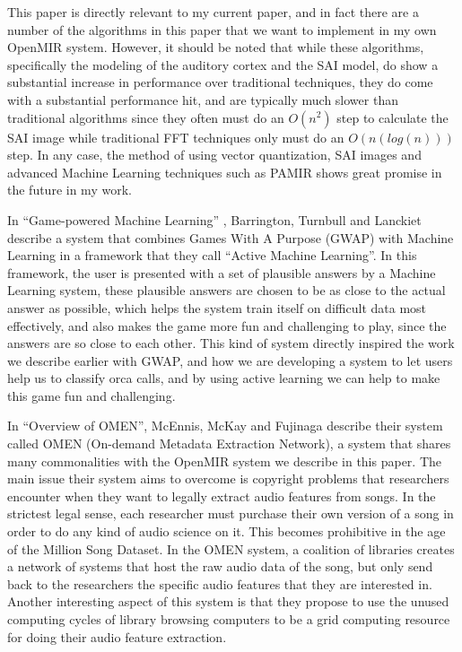 This paper is directly relevant to my current paper, and in fact there
are a number of the algorithms in this paper that we want to implement
in my own OpenMIR system.  However, it should be noted that while
these algorithms, specifically the modeling of the auditory cortex and
the SAI model, do show a substantial increase in performance over
traditional techniques, they do come with a substantial performance
hit, and are typically much slower than traditional algorithms since
they often must do an $O(n^2)$ step to calculate the SAI image while
traditional FFT techniques only must do an $O(n(log(n)))$ step.  In
any case, the method of using vector quantization, SAI images and
advanced Machine Learning techniques such as PAMIR shows great promise
in the future in my work.

In ``Game-powered Machine Learning'' \cite{barrington12}, Barrington,
Turnbull and Lanckiet describe a system that combines Games With A
Purpose (GWAP) with Machine Learning in a framework that they call
``Active Machine Learning''.  In this framework, the user is presented
with a set of plausible answers by a Machine Learning system, these
plausible answers are chosen to be as close to the actual answer as
possible, which helps the system train itself on difficult data most
effectively, and also makes the game more fun and challenging to play,
since the answers are so close to each other.  This kind of system
directly inspired the work we describe earlier with GWAP, and how we
are developing a system to let users help us to classify orca calls,
and by using active learning we can help to make this game fun and
challenging.

In ``Overview of OMEN''\cite{McEnnis2006}, McEnnis, McKay and Fujinaga
describe their system called OMEN (On-demand Metadata Extraction
Network), a system that shares many commonalities with the OpenMIR
system we describe in this paper.  The main issue their system aims to
overcome is copyright problems that researchers encounter when they
want to legally extract audio features from songs.  In the strictest
legal sense, each researcher must purchase their own version of a song
in order to do any kind of audio science on it.  This becomes
prohibitive in the age of the Million Song Dataset.  In the OMEN
system, a coalition of libraries creates a network of systems that
host the raw audio data of the song, but only send back to the
researchers the specific audio features that they are interested in.
Another interesting aspect of this system is that they propose to use
the unused computing cycles of library browsing computers to be a grid
computing resource for doing their audio feature extraction.

